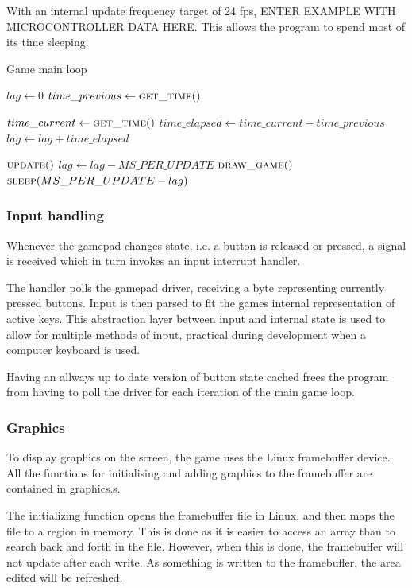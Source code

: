 With an internal update frequency target of 24 fps, ENTER EXAMPLE WITH
MICROCONTROLLER DATA HERE.  This allows the program to spend most of its time
sleeping.

\begin{algorithm}
  \caption{Game main loop}
  \begin{algorithmic}
    \State $lag \gets 0$
    \State $time\_previous \gets \Call{get\_time}{\null}$

    \Loop
      \State $time\_current \gets \Call{get\_time}{\null}$
      \State $time\_elapsed \gets time\_current - time\_previous$
      \State $lag \gets lag + time\_elapsed$

        \State $\Call{update}{\null}$
        \State $lag \gets lag - MS\_PER\_UPDATE$
      \EndWhile
      \State $\Call{draw\_game}{\null}$
      \State $\Call{sleep}{MS\_PER\_UPDATE - lag}$
    \EndLoop
  \end{algorithmic}
\end{algorithm}

\subsubsection{Input handling}
Whenever the gamepad changes state, i.e. a button is released or pressed,
a signal is received which in turn invokes an input interrupt handler.

The handler polls the gamepad driver, receiving a byte representing currently
pressed buttons. Input is then parsed to fit the games internal representation
of active keys. This abstraction layer between input and internal state is used
to allow for multiple methods of input, practical during development when a
computer keyboard is used.

Having an allways up to date version of button state cached frees the program
from having to poll the driver for each iteration of the main game loop.

\subsubsection{Graphics}
To display graphics on the screen, the game uses the Linux framebuffer device.
All the functions for initialising and adding graphics to the framebuffer are
contained in graphics.s.

The initializing function opens the framebuffer file in Linux, and then maps the
file to a region in memory.  This is done as it is easier to access an array
than to search back and forth in the file.  However, when this is done, the
framebuffer will not update after each write. As something is written to the
framebuffer, the area edited will be refreshed.

